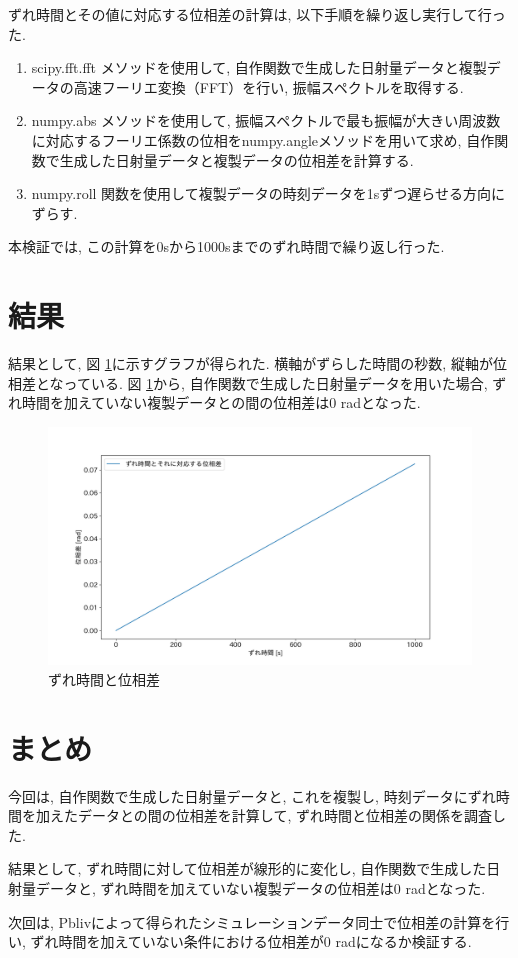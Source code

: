 \documentclass[a4j,12pt,]{jarticle}
\begin{document}
ずれ時間とその値に対応する位相差の計算は, 以下手順を繰り返し実行して行った.

\begin{enumerate}
  \item scipy.fft.fft メソッドを使用して, 自作関数で生成した日射量データと複製データの高速フーリエ変換（FFT）を行い, 振幅スペクトルを取得する.  
  \item numpy.abs メソッドを使用して, 振幅スペクトルで最も振幅が大きい周波数に対応するフーリエ係数の位相をnumpy.angleメソッドを用いて求め, 自作関数で生成した日射量データと複製データの位相差を計算する. 
  \item numpy.roll 関数を使用して複製データの時刻データを1sずつ遅らせる方向にずらす. 
\end{enumerate}

本検証では, この計算を0sから1000sまでのずれ時間で繰り返し行った. 

\section{結果}
結果として, 図 \ref{p2}に示すグラフが得られた. 横軸がずらした時間の秒数, 縦軸が位相差となっている. 図 \ref{p2}から, 自作関数で生成した日射量データを用いた場合, ずれ時間を加えていない複製データとの間の位相差は0 \si{\radian}となった.

\begin{figure}[H]
  \begin{center}
    \includegraphics[width=160mm]{phase_difference.png}
    \caption{ずれ時間と位相差}
    \label{p2}
  \end{center}
\end{figure}

\section{まとめ}
今回は, 自作関数で生成した日射量データと, これを複製し, 時刻データにずれ時間を加えたデータとの間の位相差を計算して, ずれ時間と位相差の関係を調査した.

結果として, ずれ時間に対して位相差が線形的に変化し, 自作関数で生成した日射量データと, ずれ時間を加えていない複製データの位相差は0 \si{\radian}となった.

次回は, Pblivによって得られたシミュレーションデータ同士で位相差の計算を行い, ずれ時間を加えていない条件における位相差が0 \si{\radian}になるか検証する.
\end{document}
